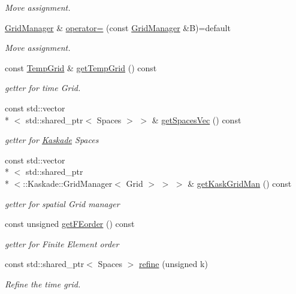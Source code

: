 \begin{DoxyCompactItemize}
\begin{DoxyCompactList}\small\item\em Move assignment. \end{DoxyCompactList}\item 
\hypertarget{classSpacy_1_1KaskadeParabolic_1_1GridManager_a97642eb7f1d415f78816ca05efe454c0}{\hyperlink{classSpacy_1_1KaskadeParabolic_1_1GridManager}{Grid\-Manager} \& \hyperlink{classSpacy_1_1KaskadeParabolic_1_1GridManager_a97642eb7f1d415f78816ca05efe454c0}{operator=} (const \hyperlink{classSpacy_1_1KaskadeParabolic_1_1GridManager}{Grid\-Manager} \&B)=default}\label{classSpacy_1_1KaskadeParabolic_1_1GridManager_a97642eb7f1d415f78816ca05efe454c0}

\begin{DoxyCompactList}\small\item\em Move assignment. \end{DoxyCompactList}\item 
const \hyperlink{classSpacy_1_1KaskadeParabolic_1_1TempGrid}{Temp\-Grid} \& \hyperlink{classSpacy_1_1KaskadeParabolic_1_1GridManager_a3c6cd1cacb32f9c9183085ec3eb9d723}{get\-Temp\-Grid} () const 
\begin{DoxyCompactList}\small\item\em getter for time Grid. \end{DoxyCompactList}\item 
const std\-::vector\\*
$<$ std\-::shared\-\_\-ptr$<$ Spaces $>$ $>$ \& \hyperlink{classSpacy_1_1KaskadeParabolic_1_1GridManager_a249e62f447d321aec148a9c9fc81c33b}{get\-Spaces\-Vec} () const 
\begin{DoxyCompactList}\small\item\em getter for \hyperlink{namespaceSpacy_1_1Kaskade}{Kaskade} Spaces \end{DoxyCompactList}\item 
const std\-::vector\\*
$<$ std\-::shared\-\_\-ptr\\*
$<$\-::Kaskade\-::\-Grid\-Manager$<$ Grid $>$ $>$ $>$ \& \hyperlink{classSpacy_1_1KaskadeParabolic_1_1GridManager_ad2bc5d73c735372a609b05153b178858}{get\-Kask\-Grid\-Man} () const 
\begin{DoxyCompactList}\small\item\em getter for spatial Grid manager \end{DoxyCompactList}\item 
const unsigned \hyperlink{classSpacy_1_1KaskadeParabolic_1_1GridManager_a1b8f7e7f434ae7c6abd390fe041dd636}{get\-F\-Eorder} () const 
\begin{DoxyCompactList}\small\item\em getter for Finite Element order \end{DoxyCompactList}\item 
const std\-::shared\-\_\-ptr$<$ Spaces $>$ \hyperlink{classSpacy_1_1KaskadeParabolic_1_1GridManager_a4de2105e61f5b6d094f26dbb953d55c2}{refine} (unsigned k)
\begin{DoxyCompactList}\small\item\em Refine the time grid. \end{DoxyCompactList}\end{DoxyCompactItemize}
